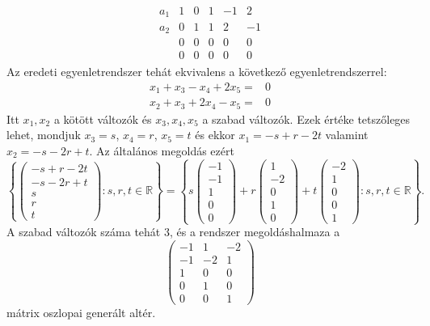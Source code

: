 \documentclass[a4paper, showtrims]{memoir}
\theoremstyle{plain}
\theoremstyle{remark}
\theoremstyle{definition}
\begin{document}
\begin{enumerate}
\begin{multline*}
\begin{array}{r|rrrrr}
			      \hline
			      a_1 & 1   & 0   & 1   & -1  & 2   \\
			      a_2 & 0   & 1   & 1   & 2   & -1  \\
			          & 0   & 0   & 0   & 0   & 0   \\
			          & 0   & 0   & 0   & 0   & 0
		      \end{array}
	      \end{multline*}
	      Az eredeti egyenletrendszer tehát ekvivalens a következő egyenletrendszerrel:
	      \[
		      \begin{array}{rl}
			      x_1+x_3-x_4+2x_5= & 0 \\
			      x_2+x_3+2x_4-x_5= & 0
		      \end{array}
	      \]
	      Itt $x_1,x_2$ a kötött változók és $x_3,x_4,x_5$ a szabad változók.
	      Ezek értéke tetszőleges lehet, mondjuk $x_3=s$, $x_4=r$, $x_5=t$ és ekkor
	      $x_1=-s+r-2t$ valamint $x_2=-s-2r+t$.
	      Az általános megoldás ezért
	      \[
		      \left\{
		      \begin{pmatrix}
			      -s+r-2t \\
			      -s-2r+t \\
			      s       \\
			      r       \\
			      t
		      \end{pmatrix}
		      :s,r,t\in\mathbb{R}
		      \right\}
		      =
		      \left\{ s
		      \begin{pmatrix}
			      -1 \\-1\\1\\0\\0
		      \end{pmatrix}
		      +
		      r
		      \begin{pmatrix}
			      1 \\-2\\0\\1\\0
		      \end{pmatrix}
		      +
		      t
		      \begin{pmatrix}
			      -2 \\1\\0\\0\\1
		      \end{pmatrix}
		      :s,r,t\in\mathbb{R}
		      \right\}.
	      \]
	      A szabad változók száma tehát $3$,
	      és a rendszer megoldáshalmaza a
	      \[
		      \begin{pmatrix}
			      -1 & 1  & -2 \\
			      -1 & -2 & 1  \\
			      1  & 0  & 0  \\
			      0  & 1  & 0  \\
			      0  & 0  & 1
		      \end{pmatrix}
	      \]
	      mátrix oszlopai generált altér.
\end{enumerate}
\end{document}
